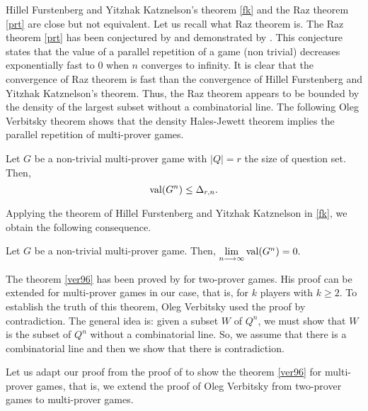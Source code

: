 Hillel Furstenberg and Yitzhak Katznelson's theorem \eqref{fk} and the Raz theorem \eqref{prt} are close but not equivalent. Let us recall what Raz theorem is. 
The Raz theorem \eqref{prt} has been conjectured by \cite{feige1992two} and demonstrated by \cite{raz1998parallel}. This conjecture states that the value of a parallel repetition of a game (non trivial) decreases exponentially  fast to $0$ when $n$ converges to infinity.  It is clear that the convergence of Raz theorem is fast than the convergence of Hillel Furstenberg and Yitzhak Katznelson's theorem. Thus, the Raz theorem appears to be bounded by the density of the largest subset without a combinatorial line.  The following Oleg Verbitsky theorem  shows that the density Hales-Jewett theorem implies the parallel repetition of multi-prover games.

\begin{thm}	 Let $G$ be a non-trivial multi-prover game with $|Q|=r$ the size of question set. Then, 
  $$\mathrm{val} (G^n) \leq \Delta_{r,n}.$$	\label{ver96} \end{thm}

Applying the theorem of Hillel Furstenberg and Yitzhak Katznelson in \eqref{fk}, we obtain the following consequence.
\begin{cor}	Let $G$ be a non-trivial multi-prover game. Then, $\lim\limits_{n\longrightarrow \infty} \mathrm{val} (G^n)=0.$ 	\end{cor}

The theorem \eqref{ver96}  has been proved by \cite{verbitsky1996towards} for two-prover games.  His proof can be extended for  multi-prover games in our case,  that is, for $k$ players with $k\geq 2.$ To establish the truth of  this theorem, Oleg Verbitsky used the proof by contradiction. The general idea is: given a subset $W$ of $Q^n$, we must show that $W$ is  the subset of $Q^n$ without a combinatorial line.
So, we assume that there is a combinatorial line and then we show that there is  contradiction.

Let us adapt our proof from the proof of  \cite{verbitsky1996towards} to show the theorem \eqref{ver96} for multi-prover games, that is, we extend the proof of Oleg Verbitsky from two-prover games to multi-prover games.

